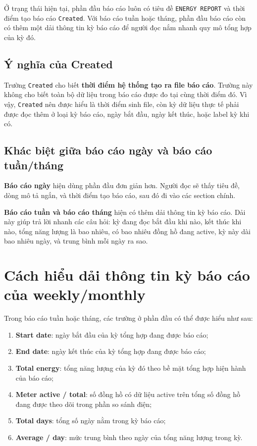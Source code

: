 Ở trạng thái hiện tại, phần đầu báo cáo luôn có tiêu đề \texttt{ENERGY REPORT} và thời điểm tạo báo cáo \texttt{Created}. Với báo cáo tuần hoặc tháng, phần đầu báo cáo còn có thêm một dải thông tin kỳ báo cáo để người đọc nắm nhanh quy mô tổng hợp của kỳ đó.

\subsection{Ý nghĩa của Created}

Trường \texttt{Created} cho biết \textbf{thời điểm hệ thống tạo ra file báo cáo}. Trường này không cho biết toàn bộ dữ liệu trong báo cáo được đo tại cùng thời điểm đó. Vì vậy, \texttt{Created} nên được hiểu là thời điểm sinh file, còn kỳ dữ liệu thực tế phải được đọc thêm ở loại kỳ báo cáo, ngày bắt đầu, ngày kết thúc, hoặc label kỳ khi có.

\subsection{Khác biệt giữa báo cáo ngày và báo cáo tuần/tháng}

\textbf{Báo cáo ngày} hiện dùng phần đầu đơn giản hơn. Người đọc sẽ thấy tiêu đề, dòng mô tả ngắn, và thời điểm tạo báo cáo, sau đó đi vào các section chính.

\textbf{Báo cáo tuần và báo cáo tháng} hiện có thêm dải thông tin kỳ báo cáo. Dải này giúp trả lời nhanh các câu hỏi: kỳ đang đọc bắt đầu khi nào, kết thúc khi nào, tổng năng lượng là bao nhiêu, có bao nhiêu đồng hồ đang active, kỳ này dài bao nhiêu ngày, và trung bình mỗi ngày ra sao.

\section{Cách hiểu dải thông tin kỳ báo cáo của weekly/monthly}

Trong báo cáo tuần hoặc tháng, các trường ở phần đầu có thể được hiểu như sau:

\begin{enumerate}[label=-]
\item \textbf{Start date}: ngày bắt đầu của kỳ tổng hợp đang được báo cáo;
\item \textbf{End date}: ngày kết thúc của kỳ tổng hợp đang được báo cáo;
\item \textbf{Total energy}: tổng năng lượng của kỳ đó theo bề mặt tổng hợp hiện hành của báo cáo;
\item \textbf{Meter active / total}: số đồng hồ có dữ liệu active trên tổng số đồng hồ đang được theo dõi trong phần so sánh điện;
\item \textbf{Total days}: tổng số ngày nằm trong kỳ báo cáo;
\item \textbf{Average / day}: mức trung bình theo ngày của tổng năng lượng trong kỳ.
\end{enumerate}

